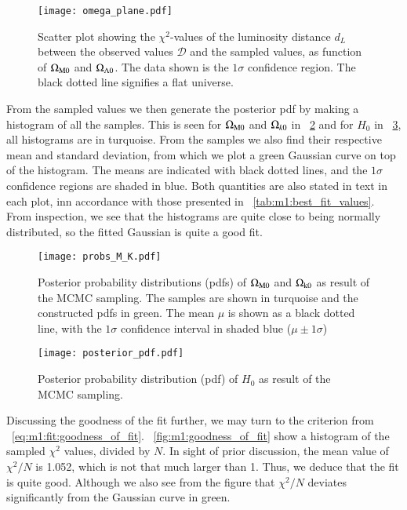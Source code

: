     \begin{figure}
        \texttt{[image: omega\_plane.pdf]}
        \caption{Scatter plot showing the $\chi^2$-values of the luminosity distance $d_L$ between the observed values $\mathcal{D}$ and the sampled values, as function of $\Omega_\mathrm{M0}$ and $\Omega_{\Lambda0}$. The data shown is the $1\sigma$ confidence region. The black dotted line signifies a flat universe. }
        \label{fig:m1:omega_planes}
    \end{figure}
    
    From the sampled values we then generate the posterior pdf by making a histogram of all the samples. This is seen for $\Omega_\mathrm{M0}$ and $\Omega_{k0}$ in ~\cref{fig:m1:posterior_pdf_omega_m_k} and for $H_0$ in ~\cref{fig:m1:posterior_pdf_H0}, all histograms are in turquoise. From the samples we also find their respective mean and standard deviation, from which we plot a green Gaussian curve on top of the histogram. The means are indicated with black dotted lines, and the $1\sigma$ confidence regions are shaded in blue. Both quantities are also stated in text in each plot, inn accordance with those presented in ~\cref{tab:m1:best_fit_values}. From inspection, we see that the histograms are quite close to being normally distributed, so the fitted Gaussian is quite a good fit. 
    
    \begin{figure}
        \texttt{[image: probs\_M\_K.pdf]}
        \caption{Posterior probability distributions (pdfs) of $\Omega_\mathrm{M0}$ and $\Omega_\mathrm{k0}$ as result of the MCMC sampling. The samples are shown in turquoise and the constructed pdfs in green. The mean $\mu$ is shown as a black dotted line, with the $1\sigma$ confidence interval in shaded blue ($\mu\pm 1\sigma$)}
        \label{fig:m1:posterior_pdf_omega_m_k}
    \end{figure}
    
    \begin{figure}
        \texttt{[image: posterior\_pdf.pdf]}
        \caption{Posterior probability distribution (pdf) of $H_0$ as result of the MCMC sampling.}
        \label{fig:m1:posterior_pdf_H0}
    \end{figure}

    Discussing the goodness of the fit further, we may turn to the criterion from ~\cref{eq:m1:fit:goodness_of_fit}. ~\cref{fig:m1:goodness_of_fit} show a histogram of the sampled $\chi^2$ values, divided by $N$. In sight of prior discussion, the mean value of $\chi^2/N$ is 1.052, which is not that much larger than 1. Thus, we deduce that the fit is quite good. Although we also see from the figure that $\chi^2/N$ deviates significantly from the Gaussian curve in green.  
    
